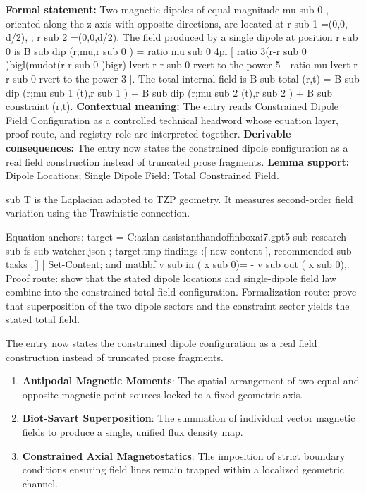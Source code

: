 \begingroup\footnotesize\setlength{\emergencystretch}{3em}\sloppy
\textbf{Formal statement:} Two magnetic dipoles of equal magnitude mu sub 0 , oriented along the z-axis with opposite directions, are located at r sub 1 =(0,0,-d/2), ; r sub 2 =(0,0,d/2). The field produced by a single dipole at position r sub 0 is B sub dip (r;mu,r sub 0 ) = ratio mu sub 0 4pi [ ratio 3(r-r sub 0 )bigl(mudot(r-r sub 0 )bigr) lvert r-r sub 0 rvert to the power 5 - ratio mu lvert r-r sub 0 rvert to the power 3 ]. The total internal field is B sub total (r,t) = B sub dip (r;mu sub 1 (t),r sub 1 ) + B sub dip (r;mu sub 2 (t),r sub 2 ) + B sub constraint (r,t). \textbf{Contextual meaning:} The entry reads Constrained Dipole Field Configuration as a controlled technical headword whose equation layer, proof route, and registry role are interpreted together. \textbf{Derivable consequences:} The entry now states the constrained dipole configuration as a real field construction instead of truncated prose fragments. \textbf{Lemma support:} Dipole Locations; Single Dipole Field; Total Constrained Field.\par
\endgroup

sub T is the Laplacian adapted to TZP geometry. It measures second-order field variation using the Trawinistic connection.

Equation anchors: target = C:azlan-assistanthandoffinboxai7.gpt5 sub research sub fs sub watcher.json ; target.tmp findings :[ new content ], recommended sub tasks :[] | Set-Content; and mathbf v sub in ( x sub 0)= - v sub out ( x sub 0),. Proof route: show that the stated dipole locations and single-dipole field law combine into the constrained total field configuration. Formalization route: prove that superposition of the two dipole sectors and the constraint sector yields the stated total field.

The entry now states the constrained dipole configuration as a real field construction instead of truncated prose fragments.
\endgroup

\begin{enumerate}[leftmargin=1.6em,itemsep=6pt,topsep=4pt]
\item \textbf{Antipodal Magnetic Moments}: The spatial arrangement of two equal and opposite magnetic point sources locked to a fixed geometric axis.
\item \textbf{Biot-Savart Superposition}: The summation of individual vector magnetic fields to produce a single, unified flux density map.
\item \textbf{Constrained Axial Magnetostatics}: The imposition of strict boundary conditions ensuring field lines remain trapped within a localized geometric channel.
\end{enumerate}

